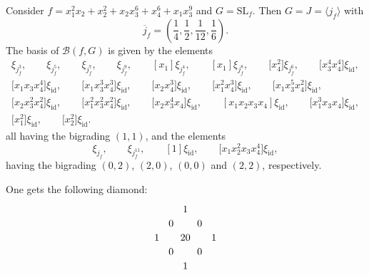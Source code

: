 \documentclass[10pt,a4paper]{article}
\numberwithin{equation}{section}
\newcommand{\SL}{{\mathrm{SL}}}
\newcommand{\id}{\mathrm{id}}
\def\B{{\mathcal B}}
\begin{document}
\begin{Example}
Consider $f = x_1^2 x_2 + x_2^2 + x_2 x_3^6 + x_4^6 + x_1x_3^9$ and $G = \SL_f$. Then $G = J = \langle j_f \rangle$ with
\[
	\overline j_f = \left(\frac{1}{4}, \frac{1}{2}, \frac{1}{12}, \frac{1}{6} \right).
\]
The basis of $\B(f,G)$ is given by the elements
\begin{gather*}
		 \xi_{j_f^3},\qquad \xi_{j_f^5}, \qquad \xi_{j_f^7}, \qquad \xi_{j_f^9},
\qquad [x_1]\xi_{j_f^4},\qquad [x_1]\xi_{j_f^8},\qquad \bigl[x_4^2\bigr]\xi_{j_f^6},\qquad \bigl[x_3^4 x_4^4\bigr]\xi_\id,
		\\
		 \bigl[x_1 x_3 x_4^4\bigr]\xi_\id, \qquad \bigl[x_1 x_3^3 x_4^3\bigr]\xi_\id, \qquad \bigl[x_2 x_4^3\bigr]\xi_\id,\qquad \bigl[x_1^2 x_4^3\bigr]\xi_\id,\qquad \bigl[x_1 x_3^5 x_4^2\bigr]\xi_\id,\\
\bigl[x_2 x_3^2 x_4^2\bigr]\xi_\id,
	\qquad \bigl[x_1^2 x_3^2 x_4^2\bigr]\xi_\id, \qquad \bigl[x_2 x_3^4 x_4\bigr]\xi_\id,\qquad  [x_1 x_2 x_3 x_4 ]\xi_\id, \qquad \bigl[x_1^3 x_3 x_4\bigr]\xi_\id,\\
\bigl[x_1^2\bigr]\xi_\id, \qquad \bigl[x_2^2\bigr]\xi_\id.
\end{gather*}
all having the bigrading $(1,1)$, and the elements
\[
	\xi_{j_f}, \qquad \xi_{j_f^{11}}, \qquad [1] \xi_\id, \qquad \bigl[x_1 x_2^2 x_3 x_4^4\bigr]\xi_\id,
\]
having the bigrading $(0,2)$, $(2,0)$, $(0,0)$ and $(2,2)$, respectively.

One gets the following diamond:
\[
 \begin{tikzpicture}
 \begin{scope}[x={(-0.50cm,-.50cm)},y={(0.50cm,-.50cm)}]
 \draw (0,0) node {1};
 \draw (1,0) node {0};
 \draw (0,1) node {0};
 \draw (2,2) node {1};
 \draw (2,0) node {1};
 \draw (0,2) node {1};
 \draw (1,2) node {0};
 \draw (2,1) node {0};
 \draw (1,1) node {20};
 \end{scope}
\end{tikzpicture}
\]
\end{Example}
\end{document}
